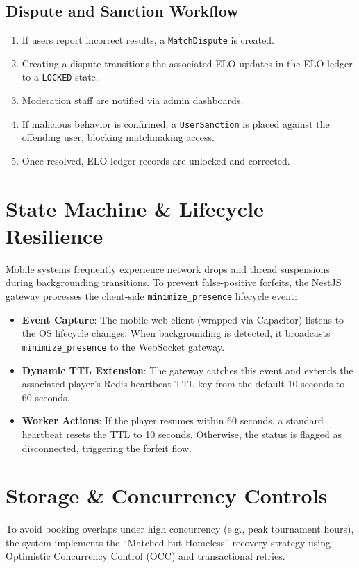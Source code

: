 \documentclass[11pt,a4paper]{report}
\begin{document}
\subsection{Dispute and Sanction Workflow}
\begin{enumerate}
    \item If users report incorrect results, a \texttt{MatchDispute} is created.
    \item Creating a dispute transitions the associated ELO updates in the ELO ledger to a \texttt{LOCKED} state.
    \item Moderation staff are notified via admin dashboards.
    \item If malicious behavior is confirmed, a \texttt{UserSanction} is placed against the offending user, blocking matchmaking access.
    \item Once resolved, ELO ledger records are unlocked and corrected.
\end{enumerate}

\section{State Machine \& Lifecycle Resilience}
Mobile systems frequently experience network drops and thread suspensions during backgrounding transitions. To prevent false-positive forfeits, the NestJS gateway processes the client-side \texttt{minimize\_presence} lifecycle event:
\begin{itemize}
    \item \textbf{Event Capture}: The mobile web client (wrapped via Capacitor) listens to the OS lifecycle changes. When backgrounding is detected, it broadcasts \texttt{minimize\_presence} to the WebSocket gateway.
    \item \textbf{Dynamic TTL Extension}: The gateway catches this event and extends the associated player's Redis heartbeat TTL key from the default 10 seconds to 60 seconds.
    \item \textbf{Worker Actions}: If the player resumes within 60 seconds, a standard heartbeat resets the TTL to 10 seconds. Otherwise, the status is flagged as disconnected, triggering the forfeit flow.
\end{itemize}

\section{Storage \& Concurrency Controls}
To avoid booking overlaps under high concurrency (e.g., peak tournament hours), the system implements the ``Matched but Homeless'' recovery strategy using Optimistic Concurrency Control (OCC) and transactional retries.
\end{document}
